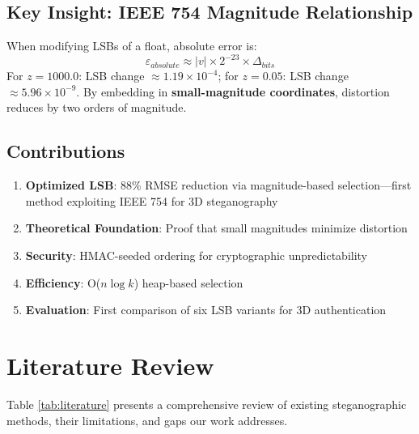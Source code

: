 \documentclass[conference]{IEEEtran}
\begin{document}
\subsection{Key Insight: IEEE 754 Magnitude Relationship}
When modifying LSBs of a float, absolute error is:
\begin{equation}
\varepsilon_{absolute} \approx |v| \times 2^{-23} \times \Delta_{bits}
\end{equation}
For $z = 1000.0$: LSB change $\approx 1.19 \times 10^{-4}$; for $z = 0.05$: LSB change $\approx 5.96 \times 10^{-9}$. By embedding in \textbf{small-magnitude coordinates}, distortion reduces by two orders of magnitude.

\subsection{Contributions}
\begin{enumerate}
\item \textbf{Optimized LSB}: 88\% RMSE reduction via magnitude-based selection---first method exploiting IEEE 754 for 3D steganography
\item \textbf{Theoretical Foundation}: Proof that small magnitudes minimize distortion
\item \textbf{Security}: HMAC-seeded ordering for cryptographic unpredictability
\item \textbf{Efficiency}: O($n \log k$) heap-based selection
\item \textbf{Evaluation}: First comparison of six LSB variants for 3D authentication
\end{enumerate}

\section{Literature Review}

Table \ref{tab:literature} presents a comprehensive review of existing steganographic methods, their limitations, and gaps our work addresses.
\end{document}
